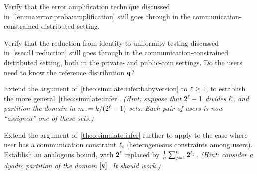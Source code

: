 \begin{question}\label{exo:error:amplification}
Verify that the error amplification technique discussed in~\cref{lemma:error:proba:amplification} still goes through in the communication-constrained distributed setting.
\end{question}
\begin{question}\label{exo:identity:reduction}
Verify that the reduction from identity to uniformity testing discussed in~\cref{ssec:l1:reduction} still goes through in the communication-constrained distributed setting, both in the private- and public-coin settings. Do the users need to know the reference distribution $\mathbf{q}$?
\end{question}
\begin{question}[$\star$]\label{exo:simulate:infer}
Extend the argument of~\cref{theo:simulate:infer:babyversion} to $\ell\geq 1$, to establish the more general~\cref{theo:simulate:infer}. \emph{(Hint: suppose that $2^\ell -1$ divides $k$, and partition the domain in $m:= k/(2^\ell -1)$ sets. Each pair of users is now ``assigned'' one of these sets.)}
\end{question}
\begin{question}[$\star\star$]\label{exo:heterogeneous}
Extend the argument of~\cref{theo:simulate:infer} further to apply to the case where user has a communication constraint $\ell_i$ (heterogeneous constraints among users). Establish an analogous bound, with $2^\ell$ replaced by $\frac{1}{n}\sum_{j=1}^n 2^{\ell_j}$. \emph{(Hint: consider a dyadic partition of the domain $[k]$. It \emph{should} work.)}
\end{question}
